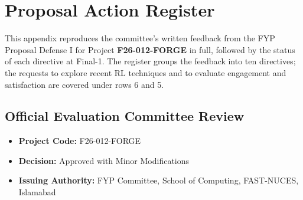 \chapter{Proposal Action Register}
\label{app:action_reg}

This appendix reproduces the committee's written feedback from the FYP Proposal Defense I for Project \textbf{F26-012-FORGE} in full, followed by the status of each directive at Final-1. The register groups the feedback into ten directives; the requests to explore recent RL techniques and to evaluate engagement and satisfaction are covered under rows 6 and 5.

\section*{Official Evaluation Committee Review}
\begin{itemize}
    \item \textbf{Project Code:} F26-012-FORGE
    \item \textbf{Decision:} Approved with Minor Modifications
    \item \textbf{Issuing Authority:} FYP Committee, School of Computing, FAST-NUCES, Islamabad
\end{itemize}

